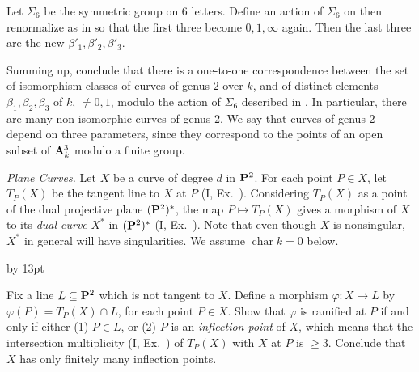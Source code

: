{{{\noindent\hypertarget{ex-IV-2.2d}{}Let $\Sigma_6$ be the symmetric group on $6$ letters. Define an action of $\Sigma_6$ on
then renormalize as in  so that the first three become $0,1,\infty$ again. Then the last three are the new $\beta'_1,\beta'_2,\beta'_3$.

\noindent\hypertarget{ex-IV-2.2e}{}Summing up, conclude that there is a one-to-one correspondence between the set of isomorphism classes of curves of genus $2$ over $k$, and  of distinct elements $\beta_1,\beta_2,\beta_3$ of $k$, $\ne0,1$, modulo the action of $\Sigma_6$ described in . In particular, there are many non-isomorphic curves of genus $2$. We say that curves of genus $2$ depend on three parameters, since they correspond to the points of an open subset of $\AffSpace[k]{3}$ modulo a finite group.\par}

\smallskip
\noindent\hypertarget{ex-IV-2.3}{}\emph{Plane Curves.} Let $X$ be a curve of degree $d$ in $\mathbf{P}^2$. For each point $P\in X$, let $T_P(X)$ be the tangent line to $X$ at $P$ (I, Ex.~). Considering $T_P(X)$ as a point of the dual projective plane $(\mathbf{P}^2)^*$, the map $P\mapsto T_P(X)$ gives a morphism of $X$ to its \emph{dual curve} $X^*$ in $(\mathbf{P}^2)^*$ (I, Ex.~). Note that even though $X$ is nonsingular, $X^*$ in general will have singularities. We assume $\operatorname{char}k=0$ below.
{\advance\leftskip by 13pt\par
\noindent\hypertarget{ex-IV-2.3a}{}Fix a line $L\subseteq\mathbf{P}^2$ which is not tangent to $X$. Define a morphism $\varphi\colon X\to L$ by $\varphi(P)=T_P(X)\cap L$, for each point $P\in X$. Show that $\varphi$ is ramified at $P$ if and only if either (1) $P\in L$, or (2) $P$ is an \emph{inflection point} of $X$, which means that the intersection multiplicity (I, Ex.~) of $T_P(X)$ with $X$ at $P$ is $\geq3$. Conclude that $X$ has only finitely many inflection points.\par}\par}
}
